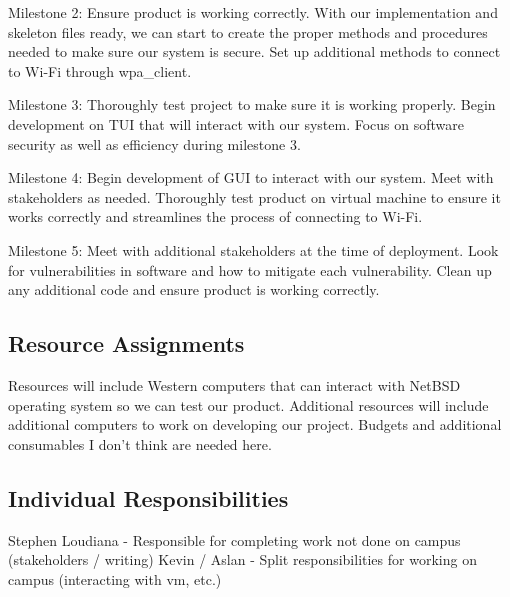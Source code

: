 Milestone 2: Ensure product is working correctly. With our implementation and skeleton files ready, we can start to create the proper methods and procedures 
needed to make sure our system is secure. Set up additional methods to connect to Wi-Fi through wpa\_client. 

Milestone 3: Thoroughly test project to make sure it is working properly. Begin development on TUI that will interact with our system. Focus on software security 
as well as efficiency during milestone 3. 

Milestone 4: Begin development of GUI to interact with our system. Meet with stakeholders as needed. Thoroughly test product on virtual machine to ensure it works 
correctly and streamlines the process of connecting to Wi-Fi. 

Milestone 5: Meet with additional stakeholders at the time of deployment. Look for vulnerabilities in software and how to mitigate each vulnerability. Clean up any 
additional code and ensure product is working correctly. 


\subsection{Resource Assignments}
%

Resources will include Western computers that can interact with NetBSD operating system so we can test our product. Additional resources will include 
additional computers to work on developing our project. Budgets and additional consumables I don’t think are needed here. 


\subsection{Individual Responsibilities}
%
Stephen Loudiana - Responsible for completing work not done on campus (stakeholders / writing)
Kevin / Aslan - Split responsibilities for working on campus (interacting with vm, etc.) 

